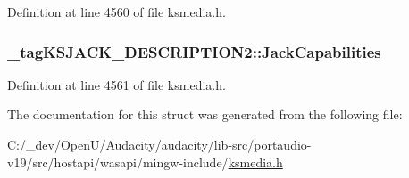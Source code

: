 Definition at line 4560 of file ksmedia.\+h.

\subsubsection[{\texorpdfstring{Jack\+Capabilities}{JackCapabilities}}]{ \+\_\+tag\+K\+S\+J\+A\+C\+K\+\_\+\+D\+E\+S\+C\+R\+I\+P\+T\+I\+O\+N2\+::\+Jack\+Capabilities}\hypertarget{struct__tag_k_s_j_a_c_k___d_e_s_c_r_i_p_t_i_o_n2_a43c3043182b781835617f8bf666e7250}{}\label{struct__tag_k_s_j_a_c_k___d_e_s_c_r_i_p_t_i_o_n2_a43c3043182b781835617f8bf666e7250}


Definition at line 4561 of file ksmedia.\+h.



The documentation for this struct was generated from the following file\+:\begin{DoxyCompactItemize}
\item 
C\+:/\+\_\+dev/\+Open\+U/\+Audacity/audacity/lib-\/src/portaudio-\/v19/src/hostapi/wasapi/mingw-\/include/\hyperlink{ksmedia_8h}{ksmedia.\+h}\end{DoxyCompactItemize}

